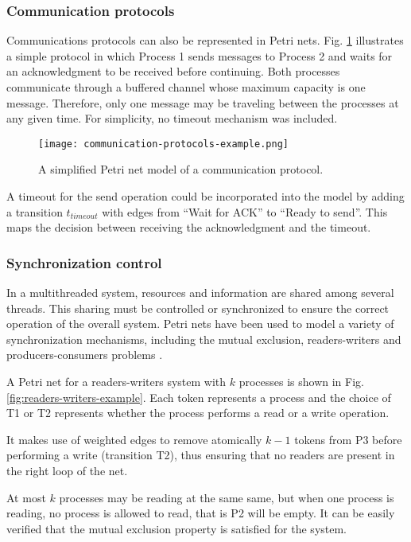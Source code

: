 \subsubsection{Communication protocols}

Communications protocols can also be represented in Petri nets.
Fig. \ref{fig:communication-protocols-example} illustrates a simple protocol
in which Process 1 sends messages to Process 2 and waits for an acknowledgment to be received before continuing.
Both processes communicate through a buffered channel whose maximum capacity is one message.
Therefore, only one message may be traveling between the processes at any given time.
For simplicity, no timeout mechanism was included.

\begin{figure}[H]
    \centering
    \texttt{[image: communication-protocols-example.png]}
    \caption{A simplified Petri net model of a communication protocol.}
    \label{fig:communication-protocols-example}
\end{figure}

A timeout for the send operation could be incorporated into the model
by adding a transition $t_{timeout}$ with edges from ``Wait for ACK'' to ``Ready to send''.
This maps the decision between receiving the acknowledgment and the timeout.

\subsubsection{Synchronization control}

In a multithreaded system, resources and information are shared among several threads.
This sharing must be controlled or synchronized to ensure the correct operation of the overall system.
Petri nets have been used to model a variety of synchronization mechanisms,
including the mutual exclusion, readers-writers and producers-consumers problems \cite{murata1989}.

A Petri net for a readers-writers system with $k$ processes is shown in Fig. \ref{fig:readers-writers-example}.
Each token represents a process and the choice of T1 or T2
represents whether the process performs a read or a write operation.

It makes use of weighted edges to remove atomically
$k - 1$ tokens from P3 before performing a write (transition T2),
thus ensuring that no readers are present in the right loop of the net.

At most $k$ processes may be reading at the same same,
but when one process is reading, no process is allowed to read, that is P2 will be empty.
It can be easily verified that the mutual exclusion property is satisfied for the system.

